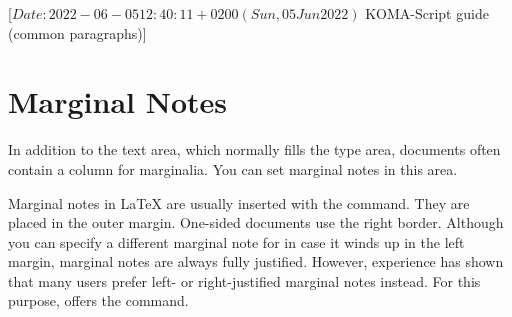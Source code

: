 %
%
%
%
%
%
%

                 [$Date: 2022-06-05 12:40:11 +0200 (Sun, 05 Jun 2022) $
                  KOMA-Script guide (common paragraphs)]

\section{Marginal Notes}
%
\BeginIndexGroup
{}%


In addition to the text area, which normally fills the type area, documents
often contain a column for marginalia. You can set marginal notes in this 
area.
%


\begin{Declaration}
\end{Declaration}%
Marginal notes in {\LaTeX} are usually
inserted with the  command. They are placed in the outer
margin. One-sided documents use the right border. Although you can specify a
different marginal note for  in case it winds up in the left
margin, marginal notes are always fully justified. However, experience has
shown that many users prefer left- or right-justified marginal notes
instead. For this purpose, {\KOMAScript} offers the 
command.

